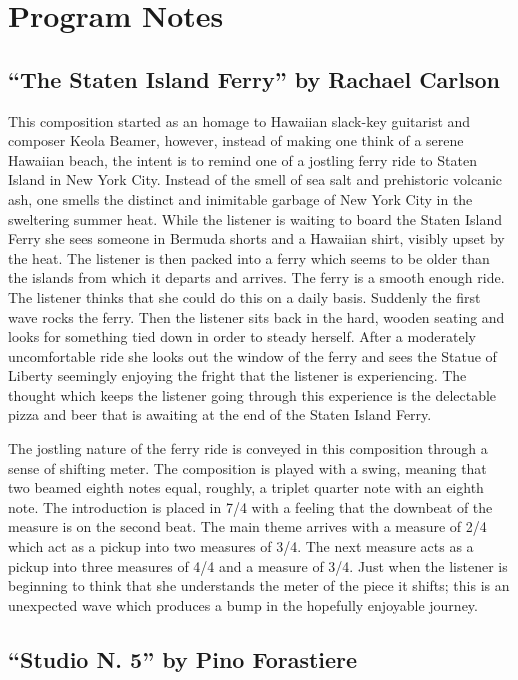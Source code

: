 \documentclass{tufte-handout}
\begin{document}
\clearpage

\section*{Program Notes}
\label{sec:program-notes}
\subsection*{``The Staten Island Ferry'' by Rachael Carlson}
This composition started as an homage to Hawaiian slack-key guitarist and
composer Keola Beamer, however, instead of making one think of a serene
Hawaiian beach, the intent is to remind one of a jostling ferry ride to Staten
Island in New York City. Instead of the smell of sea salt and prehistoric
volcanic ash, one smells the distinct and inimitable garbage of New York City
in the sweltering summer heat. While the listener is waiting to board the
Staten Island Ferry she sees someone in Bermuda shorts and a Hawaiian shirt,
visibly upset by the heat. The listener is then packed into a ferry which
seems to be older than the islands from which it departs and arrives. The
ferry is a smooth enough ride. The listener thinks that she could do this on a
daily basis. Suddenly the first wave rocks the ferry. Then the listener sits
back in the hard, wooden seating and looks for something tied down in order to
steady herself. After a moderately uncomfortable ride she looks out the window
of the ferry and sees the Statue of Liberty seemingly enjoying the fright that
the listener is experiencing. The thought which keeps the listener going
through this experience is the delectable pizza and beer that is awaiting at
the end of the Staten Island Ferry. 

The jostling nature of the ferry ride is conveyed in this composition through
a sense of shifting meter. The composition is played with a swing, meaning
that two beamed eighth notes equal, roughly, a triplet quarter note with an
eighth note. The introduction is placed in 7/4 with a feeling that the
downbeat of the measure is on the second beat. The main theme arrives with a
measure of 2/4 which act as a pickup into two measures of 3/4. The next
measure acts as a pickup into three measures of 4/4 and a measure of 3/4. Just
when the listener is beginning to think that she understands the meter of the
piece it shifts; this is an unexpected wave which produces a bump in the
hopefully enjoyable journey.
\subsection*{``Studio N. 5'' by Pino Forastiere}
\end{document}
